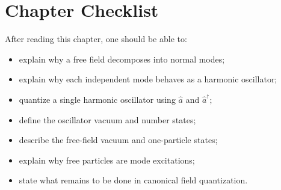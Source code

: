 \section{Chapter Checklist}

After reading this chapter, one should be able to:
\begin{itemize}
    \item explain why a free field decomposes into normal modes;
    \item explain why each independent mode behaves as a harmonic oscillator;
    \item quantize a single harmonic oscillator using \(\hat a\) and
    \(\hat a^\dagger\);
    \item define the oscillator vacuum and number states;
    \item describe the free-field vacuum and one-particle states;
    \item explain why free particles are mode excitations;
    \item state what remains to be done in canonical field quantization.
\end{itemize}
